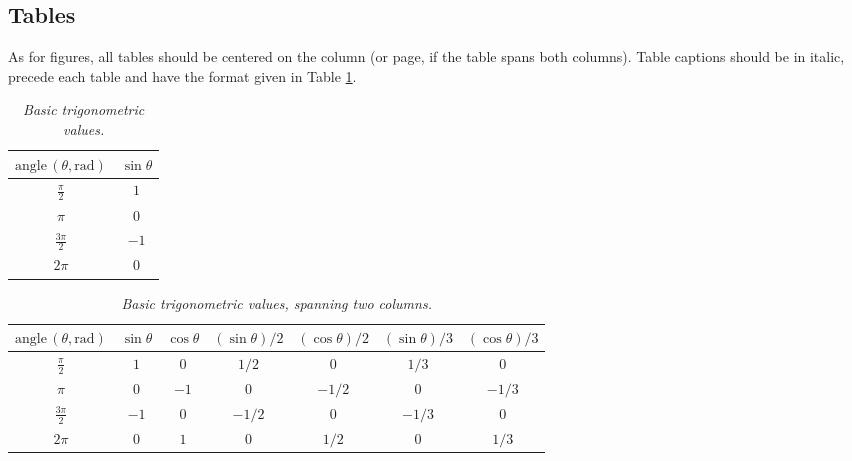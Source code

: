 \documentclass[twoside,a4paper]{article}
\begin{document}
\subsection{Tables}
As for figures, all tables should be centered on the column (or page, if the table spans both columns).
Table captions should be in italic, precede each table and have the format given in Table \ref{tab:example}.

\begin{table}[ht]
  \caption{\itshape Basic trigonometric values.}
  \centering
  \begin{tabular}{|c|c|}
    \hline
    $\mathrm{angle}\,(\theta, \mathrm{rad})$ & $\sin \theta$ \\\hline
    $\frac{\pi}{2}$                          & $1$           \\
    $\pi$                                    & $0$           \\
    $\frac{3\pi}{2}$                         & $-1$          \\
    $2\pi$                                   & $0$           \\\hline
  \end{tabular}
  \label{tab:example}
\end{table}

\begin{table}[ht]
  \caption{{\it Basic trigonometric values, spanning two columns.}}
  \centering
  \begin{tabular}{|c|c|c|c|c|c|c|}\hline
    $\mathrm{angle}\, (\theta, \mathrm{rad})$ & $\sin \theta$ & $\cos \theta $ & $(\sin \theta)/2 $ & $(\cos \theta) /2 $ & $(\sin \theta)/3 $ & $(\cos \theta)/3$ \\\hline
    $\frac{\pi}{2}$                           & $1$           & $0$            & $1/2$              & $0$                 & $1/3$              & $0$               \\
    $\pi$                                     & $0$           & $-1$           & $0$                & $-1/2$              & $0$                & $-1/3$            \\
    $\frac{3\pi}{2}$                          & $-1$          & $0$            & $-1/2$             & $0$                 & $-1/3$             & $0$               \\
    $2\pi$                                    & $0$           & $1$            & $0$                & $1/2$               & $0$                & $1/3$             \\\hline
  \end{tabular}
  \label{tab:example2}
\end{table}
\end{document}
